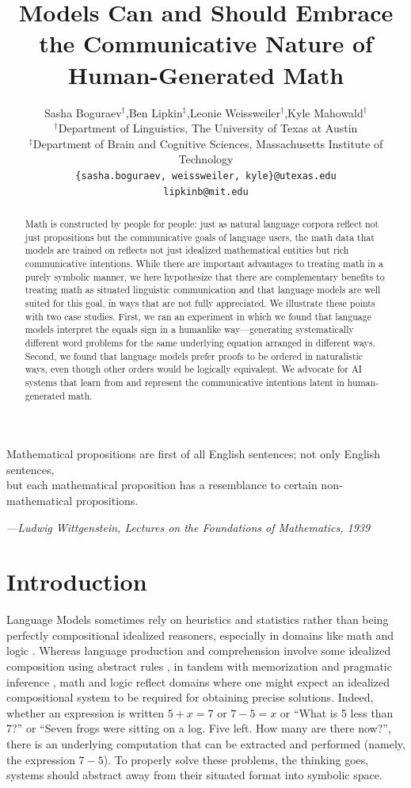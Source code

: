 \documentclass{article}
\title{Models Can and Should Embrace the Communicative Nature of Human-Generated Math}
\author{%
   Sasha Boguraev\(^\dag\),\quad Ben Lipkin\(^\ddag\),\quad Leonie Weissweiler\(^\dag\),\quad Kyle Mahowald\(^\dag\)\\ 
   \(^\dag\)Department of Linguistics, The University of Texas at Austin \\
   \(^\ddag\)Department of Brain and Cognitive Sciences, Massachusetts Institute of Technology \\
\texttt{\{sasha.boguraev, weissweiler, kyle\}@utexas.edu}\\
\texttt{lipkinb@mit.edu}\\
}
\begin{document}
\maketitle


\begin{abstract}
Math is constructed by people for people:
just as natural language corpora reflect not just propositions but the communicative goals of language users, the math data that models are trained on reflects not just idealized mathematical entities but rich communicative intentions.
While there are important advantages to treating math in a purely symbolic manner, we here hypothesize that there are complementary benefits to treating math as situated linguistic communication and that language models are well suited for this goal, in ways that are not fully appreciated.
We illustrate these points with two case studies. First, we ran an experiment in which we found that language models interpret the equals sign in a humanlike way---generating systematically different word problems for the same underlying equation arranged in different ways. 
Second, we found that language models prefer proofs to be ordered in naturalistic ways, even though other orders would be logically equivalent.
We advocate for AI systems that learn from and represent the communicative intentions latent in human-generated math.
\end{abstract}

\renewcommand{\epigraphflush}{center}
\setlength{\epigraphwidth}{0.9\textwidth}
\setlength{\beforeepigraphskip}{0mm}
\setlength{\afterepigraphskip}{0mm}
\epigraph{Mathematical propositions are first of all English sentences; not only English sentences, \\but each mathematical proposition has a resemblance to certain non-mathematical propositions. }{\textit{---Ludwig Wittgenstein, \textit{Lectures on the Foundations of Mathematics}, 1939}}

\section{Introduction}

Language Models sometimes rely on heuristics and statistics rather than being perfectly compositional idealized reasoners, especially in domains like math and logic \citep{mccoy2023embers,mirzadeh2024gsm, opedal2024mathgap,opedal2024language,patel-etal-2021-nlp,razeghi-etal-2022, shi2023large,stolfo2023causal}.
Whereas language production and comprehension involve some idealized composition using abstract rules \citep{chomsky1957syntactic,heim1998semantics},
in tandem with memorization and pragmatic inference \citep{clark1996using,goldberg2019assessing}, math and logic reflect domains where one might expect an idealized compositional system to be required for obtaining precise solutions.
Indeed, whether an expression is written \(5 + x = 7\) or \(7 - 5 = x\) or ``What is 5 less than 7?'' or ``Seven frogs were sitting on a log. Five left. How many are there now?'', there is an underlying computation that can be extracted and performed (namely, the expression \(7 - 5\)).
To properly solve these problems, the thinking goes, systems should abstract away from their situated format into symbolic space.
\end{document}
